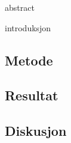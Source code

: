 \documentclass {article}
\begin{document}
 {abstract}

 {introduksjon}

\subsection {Metode}

\subsection {Resultat}

\subsection {Diskusjon}



\end{document}
